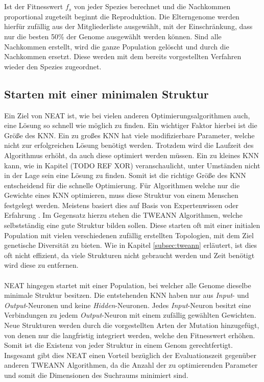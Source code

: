\\\\
Ist der Fitnesswert $f_s$ von jeder Spezies berechnet und die Nachkommen proportional zugeteilt beginnt die Reproduktion. Die Elterngenome werden hierfür zufällig aus der Mitgliederliste ausgewählt, mit der Einschränkung, dass nur die besten 50\% der Genome ausgewählt werden können. Sind alle Nachkommen erstellt, wird die ganze Population gelöscht und durch die Nachkommen ersetzt. Diese werden mit dem bereits vorgestellten Verfahren wieder den Spezies zugeordnet.
\subsection{Starten mit einer minimalen Struktur}
Ein Ziel von \ac{NEAT} ist, wie bei vielen anderen Optimierungsalgorithmen auch, eine Lösung so schnell wie möglich zu finden. Ein wichtiger Faktor hierbei ist die Größe des \ac{KNN}. Ein zu großes \ac{KNN} hat viele modifizierbare Parameter, welche nicht zur erfolgreichen Lösung benötigt werden. Trotzdem wird die Laufzeit des Algorithmus erhöht, da auch diese optimiert werden müssen. Ein zu kleines \ac{KNN} kann, wie in Kapitel (TODO REF XOR) veranschaulicht, unter Umständen nicht in der Lage sein eine Lösung zu finden. Somit ist die richtige Größe des \ac{KNN} entscheidend für die schnelle Optimierung. Für Algorithmen welche nur die Gewichte eines \ac{KNN} optimieren, muss diese Struktur von einem Menschen festgelegt werden. Meistens basiert dies auf Basis von Expertenwissen oder Erfahrung \cite{stanley2017oreilly}. Im Gegensatz hierzu stehen die \ac{TWEANN} Algorithmen, welche selbstständig eine gute Struktur bilden sollen. Diese starten oft mit einer initialen Population mit vielen verschiedenen zufällig erstellten Topologien, mit dem Ziel genetische Diversität zu bieten. Wie in Kapitel \ref{subsec:tweann} erläutert, ist dies oft nicht effizient, da viele Strukturen nicht gebraucht werden und Zeit benötigt wird diese zu entfernen.
\\\\
\ac{NEAT} hingegen startet mit einer Population, bei welcher alle Genome dieselbe minimale Struktur besitzen. Die entstehenden \ac{KNN} haben nur aus \emph{Input}- und \emph{Output}-Neuronen und keine \emph{Hidden}-Neuronen. Jedes \emph{Input}-Neuron besitzt eine Verbindungen zu jedem \emph{Output}-Neuron mit einem zufällig gewählten Gewichten. Neue Strukturen werden durch die vorgestellten Arten der Mutation hinzugefügt, von denen nur die langfristig integriert werden, welche den Fitnesswert erhöhen. Somit ist die Existenz von jeder Struktur in einem Genom gerechtfertigt. Insgesamt gibt dies \ac{NEAT} einen Vorteil bezüglich der Evaluationszeit gegenüber anderen \ac{TWEANN} Algorithmen, da die Anzahl der zu optimierenden Parameter und somit die Dimensionen des Suchraums minimiert sind.